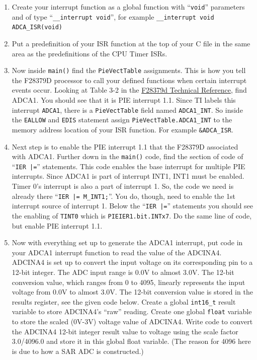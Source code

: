 \documentclass[11pt]{article}
\begin{document}
\begin{enumerate}
        \item Create your interrupt function as a global function with “\texttt{void}” parameters and of type “\texttt{__interrupt void}”, for example \texttt{__interrupt void ADCA_ISR(void) }
    \item Put a predefinition of your ISR function at the top of your C file in the same area as the predefinitions of the CPU Timer ISRs.
        \item Now inside \texttt{main()} find the \texttt{PieVectTable} assignments. This is how you tell the F28379D processor to call your defined functions when certain interrupt events occur. Looking at Table 3-2 in the \href{http://coecsl.ece.illinois.edu/se423/PeripheralInterruptChannelMapTable.pdf}{F28379d Technical Reference}, find ADCA1. You should see that it is PIE interrupt 1.1. Since TI labels this interrupt \texttt{ADCA1}, there is a \texttt{PieVectTable} field named \texttt{ADCA1_INT}. So inside the \texttt{EALLOW} and \texttt{EDIS} statement assign \texttt{PieVectTable.ADCA1_INT} to the memory address location of your ISR function. For example \texttt{&ADCA_ISR}.
        \item Next step is to enable the PIE interrupt 1.1 that the F28379D associated with ADCA1. Further down in the \texttt{main()} code, find the section of code of “\texttt{IER |=}” statements. This code enables the base interrupt for multiple PIE interrupts. Since ADCA1 is part of interrupt INT1, INT1 must be enabled. Timer 0’s interrupt is also a part of interrupt 1. So, the code we need is already there “\texttt{IER |= M_INT1;}”. You do, though, need to enable the 1st interrupt source of interrupt 1. Below the “\texttt{IER |=}” statements you should see the enabling of \texttt{TINT0} which is \texttt{PIEIER1.bit.INTx7}. Do the same line of code, but enable PIE interrupt 1.1.
        \item Now with everything set up to generate the ADCA1 interrupt, put code in your ADCA1 interrupt function to read the value of the ADCINA4. ADCINA4 is set up to convert the input voltage on its corresponding pin to a 12-bit integer. The ADC input range is 0.0V to almost 3.0V. The 12-bit conversion value, which ranges from 0 to 4095, linearly represents the input voltage from 0.0V to almost 3.0V. The 12-bit conversion value is stored in the results register, see the given code below. Create a global \texttt{int16_t} result variable to store ADCINA4’s “raw” reading. Create one global \texttt{float} variable to store the scaled (0V-3V) voltage value of ADCINA4. Write code to convert the ADCINA4 12-bit integer result value to voltage using the scale factor 3.0/4096.0 and store it in this global float variable. (The reason for 4096 here is due to how a SAR ADC is constructed.)

\end{enumerate}
\end{document}
